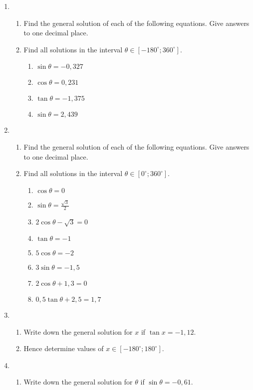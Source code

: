 {
\begin{enumerate}
\item 
	\begin{enumerate}
	\item Find the general solution of each of the following equations. Give answers to one decimal place.
	\item Find all solutions in the interval $\theta \in [-180^\circ ;360^\circ]$.
		\begin{enumerate}
		\item $\sin \theta = -0,327$
		\item $\cos\theta = 0,231$
		\item $\tan\theta = -1,375$
		\item $\sin\theta = 2,439$
		\end{enumerate}
	\end{enumerate}
\item 
	\begin{enumerate}
	\item Find the general solution of each of the following equations. Give answers to one decimal place.
	\item Find all solutions in the interval $\theta \in [0^\circ ;360^\circ]$.
		\begin{enumerate}
		\item $\cos\theta = 0$
		\item $\sin\theta = \frac{\sqrt{3}}{2}$
		\item $2\cos\theta -\sqrt{3} = 0$
		\item $\tan\theta = -1 $
		\item $5\cos\theta = -2$
		\item $3\sin\theta=-1,5$
		\item $2\cos\theta+1,3=0$
		\item $0,5\tan\theta +2,5=1,7$
		\end{enumerate}
	\end{enumerate}
\item 
	\begin{enumerate}
	\item Write down the general solution for $x$ if $\tan x = -1,12$.
	\item Hence determine values of $x \in [-180^\circ;180^\circ]$.
	\end{enumerate}
\item 
	\begin{enumerate}
	\item Write down the general solution for $\theta$ if $\sin \theta = -0,61$.

\end{enumerate}
\end{enumerate}}
